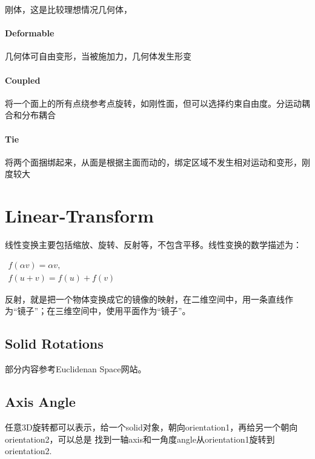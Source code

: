 刚体，这是比较理想情况几何体，

\paragraph{Deformable} 

几何体可自由变形，当被施加力，几何体发生形变

\paragraph{Coupled}

将一个面上的所有点绕参考点旋转，如刚性面，但可以选择约束自由度。分运动耦合和分布耦合

\paragraph{Tie}

将两个面捆绑起来，从面是根据主面而动的，绑定区域不发生相对运动和变形，刚度较大


 
\section{Linear-Transform}

线性变换主要包括缩放、旋转、反射等，不包含平移。线性变换的数学描述为：

\begin{math}
\begin{aligned}
f(\alpha v)=\alpha v, \\
f(u+v)=f(u)+f(v)
\end{aligned}
\end{math}


反射，就是把一个物体变换成它的镜像的映射，在二维空间中，用一条直线作为“镜子”；在三维空间中，使用平面作为“镜子”。



\subsection{Solid Rotations}

部分内容参考Euclidenan Space网站\cite{Euclideanspace}。

\subsection{Axis Angle}

任意3D旋转都可以表示，给一个solid对象，朝向orientation1，再给另一个朝向orientation2，可以总是
找到一轴axis和一角度angle从orientation1旋转到orientation2.

